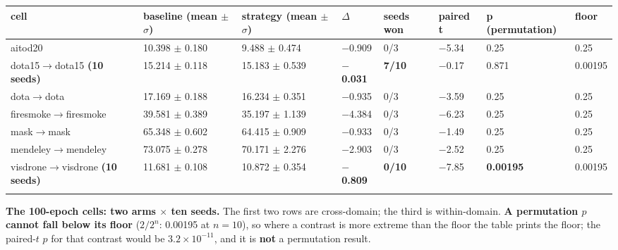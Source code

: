 \documentclass[pdflatex,sn-mathphys-ay]{sn-jnl}
\begin{document}
{\footnotesize
\setlength{\tabcolsep}{4pt}
\begin{longtable}{p{}p{}p{}p{}p{}p{}p{}p{}}
\toprule
cell & baseline (mean \ensuremath{\pm} \ensuremath{\sigma}) & strategy (mean \ensuremath{\pm} \ensuremath{\sigma}) & \ensuremath{\Delta} & seeds won & paired t & p (permutation) & floor \\
\midrule
\endhead
aitod20 & 10.398 \ensuremath{\pm} 0.180 & 9.488 \ensuremath{\pm} 0.474 & \ensuremath{-}0.909 & 0/3 & \ensuremath{-}5.34 & 0.25 & 0.25 \\
dota15\ensuremath{\rightarrow}dota15 \textbf{(10 seeds)} & 15.214 \ensuremath{\pm} 0.118 & 15.183 \ensuremath{\pm} 0.539 & \textbf{\ensuremath{-}0.031} & \textbf{7/10} & \ensuremath{-}0.17 & 0.871 & 0.00195 \\
dota\ensuremath{\rightarrow}dota & 17.169 \ensuremath{\pm} 0.188 & 16.234 \ensuremath{\pm} 0.351 & \ensuremath{-}0.935 & 0/3 & \ensuremath{-}3.59 & 0.25 & 0.25 \\
firesmoke\ensuremath{\rightarrow}firesmoke & 39.581 \ensuremath{\pm} 0.389 & 35.197 \ensuremath{\pm} 1.139 & \ensuremath{-}4.384 & 0/3 & \ensuremath{-}6.23 & 0.25 & 0.25 \\
mask\ensuremath{\rightarrow}mask & 65.348 \ensuremath{\pm} 0.602 & 64.415 \ensuremath{\pm} 0.909 & \ensuremath{-}0.933 & 0/3 & \ensuremath{-}1.49 & 0.25 & 0.25 \\
mendeley\ensuremath{\rightarrow}mendeley & 73.075 \ensuremath{\pm} 0.278 & 70.171 \ensuremath{\pm} 2.276 & \ensuremath{-}2.903 & 0/3 & \ensuremath{-}2.52 & 0.25 & 0.25 \\
visdrone\ensuremath{\rightarrow}visdrone \textbf{(10 seeds)} & 11.681 \ensuremath{\pm} 0.108 & 10.872 \ensuremath{\pm} 0.354 & \textbf{\ensuremath{-}0.809} & \textbf{0/10} & \ensuremath{-}7.85 & \textbf{0.00195} & 0.00195 \\
\botrule
\end{longtable}}

\textbf{The 100-epoch cells: two arms \ensuremath{\times} ten seeds.} The first two rows are cross-domain; the third is within-domain. \textbf{A permutation $p$ cannot fall below its floor} ($2/2^{n}$: 0.00195 at $n=10$), so where a contrast is more extreme than the floor the table prints the floor; the paired-$t$ $p$ for that contrast would be $3.2\times10^{-11}$, and it is \textbf{not} a permutation result.
\end{document}
